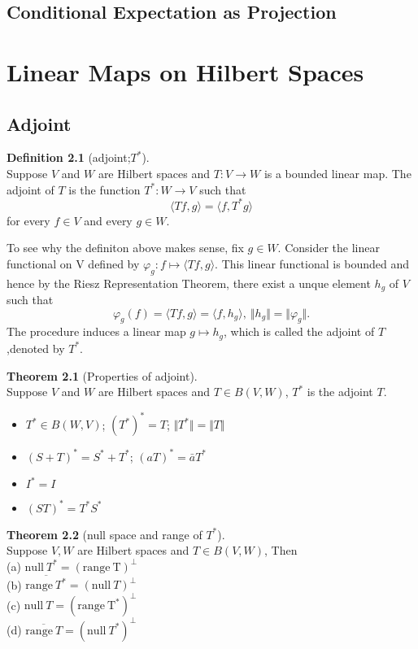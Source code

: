 \documentclass[12pt]{book}
\theoremstyle{definition}
\newtheorem{definition}{Definition}[chapter]
\newtheorem{theorem}{Theorem}[chapter]
\newcommand{\inner}[2]{{\langle #1,#2\rangle}}
\begin{document}
\section{Conditional Expectation as Projection}
\chapter{Linear Maps on Hilbert Spaces}
\section{Adjoint}
\begin{definition}[adjoint;$T^*$] \ \\
Suppose $V$ and $W$ are Hilbert spaces and $T:V \to W$ is a bounded linear map.
The adjoint of $T$ is the function $T^*:W \to V$ such that
$$
\inner{Tf}{g}=\inner{f}{T^*g}
$$
for every $f \in V$ and every $g \in W$.
\end{definition}
To see why the definiton above makes sense, fix $g\in W$. Consider the linear functional on V defined by $\varphi_g: f \mapsto \inner{Tf}{g}$. This linear functional is bounded and hence by the Riesz Representation Theorem,  there exist a unque element $h_g$ of $V$ such that
$$
\varphi_g(f)=\inner{Tf}{g}=\inner{f}{h_g}, \ \Vert h_g\Vert = \Vert \varphi_g \Vert.
$$
The procedure induces a linear map $g \mapsto h_g$, which is called the adjoint of $T$
,denoted by $T^*$.

\begin{theorem}[Properties of adjoint] \ \\
Suppose $V$ and $W$ are Hilbert spaces and $T \in B(V,W)$, $T^*$ is the adjoint $T$.
\begin{itemize}
	\item $T^* \in B(W,V)$; $(T^*)^*=T$; $\Vert T^* \Vert = \Vert T \Vert$
	\item $(S+T)^*=S^*+T^*$; $(aT)^*=\bar aT^*$
	\item $I^*=I$
	\item $(ST)^*=T^*S^*$  
\end{itemize}
\end{theorem}

\begin{theorem}[null space and range of $T^*$] \ \\
Suppose $V,W$ are Hilbert spaces and $T \in B(V,W)$, Then \\
(a) $\mathrm{null} \ T^*=(\mathrm{range\ T})^{\perp}$ \\
(b) $\overline{\mathrm{range} \ T^*}=(\mathrm{null} \ T)^{\perp}$\\
(c) $\mathrm{null} \ T=(\mathrm{range\ T^*})^{\perp}$\\
(d) $\overline{\mathrm{range} \ T}=(\mathrm{null} \ T^*)^{\perp}$
\end{theorem}
\end{document}
